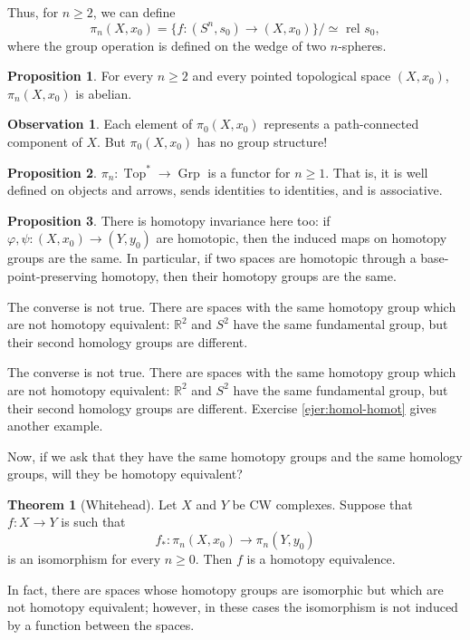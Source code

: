 \documentclass{book}
\theoremstyle{definition}
\newtheorem*{obs}{Observation}
\newtheorem*{teo}{Theorem}
\newtheorem*{prop}{Proposition}
\newcommand{\R}{\mathbb{R}}
\DeclareMathOperator{\Top}{Top}
\DeclareMathOperator{\Grp}{Grp}
\begin{document}
Thus, for $n\geq2$, we can define
$$
\pi_n(X,x_0)=
\{f:(S^n,s_0)\to(X,x_0)\}
\Big/\simeq\text{ rel }s_0,
$$
where the group operation is defined on the wedge of two
$n$-spheres.

\begin{prop}
For every $n\geq2$ and every pointed topological space
$(X,x_0)$, $\pi_n(X,x_0)$ is abelian.
\end{prop}

\begin{obs}
Each element of $\pi_0(X,x_0)$ represents a path-connected
component of $X$. But $\pi_0(X,x_0)$ has no group structure!
\end{obs}

\begin{prop}
$\pi_n:\Top^*\to\Grp$ is a functor for $n\geq1$. That is, it
is well defined on objects and arrows, sends identities to
identities, and is associative.
\end{prop}

\begin{prop}
There is homotopy invariance here too: if
$\varphi,\psi:(X,x_0)\to(Y,y_0)$ are homotopic, then the
induced maps on homotopy groups are the same. In particular,
if two spaces are homotopic through a base-point-preserving
homotopy, then their homotopy groups are the same.
\end{prop}

The converse is not true. There are spaces with the same
homotopy group which are not homotopy equivalent: $\R^2$ and
$S^2$ have the same fundamental group, but their second
homology groups are different.

The converse is not true. There are spaces with the same
homotopy group which are not homotopy equivalent: $\R^2$ and
$S^2$ have the same fundamental group, but their second
homology groups are different. Exercise \ref{ejer:homol-homot}
gives another example.

Now, if we ask that they have the same homotopy groups and
the same homology groups, will they be homotopy equivalent?

\begin{teo}[Whitehead]
Let $X$ and $Y$ be CW complexes. Suppose that $f:X\to Y$ is
such that
$$
f_*:\pi_n(X,x_0)\to\pi_n(Y,y_0)
$$
is an isomorphism for every $n\geq0$. Then $f$ is a homotopy
equivalence.
\end{teo}

In fact, there are spaces whose homotopy groups are
isomorphic but which are not homotopy equivalent; however, in
these cases the isomorphism is not induced by a function
between the spaces.
\end{document}
